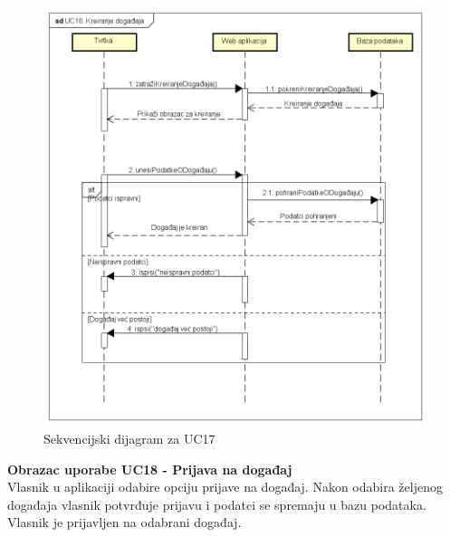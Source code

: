 				\begin{figure}[H]
					\includegraphics[scale=0.5]{slike/Uc16.PNG} %
					\centering
					\caption{Sekvencijski dijagram za UC17}
				\end{figure}
				
				\pagebreak
				\textbf{Obrazac uporabe UC18 - Prijava na događaj}\\
				\indent Vlasnik u aplikaciji odabire opciju prijave na događaj. Nakon odabira željenog događaja vlasnik potvrđuje prijavu i podatci se spremaju u bazu podataka. Vlasnik je prijavljen na odabrani događaj.
				
